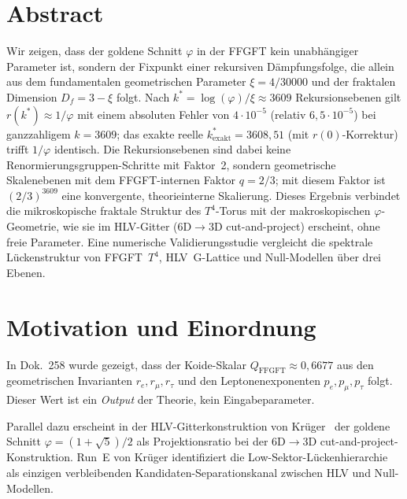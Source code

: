 
\section*{Abstract}
Wir zeigen, dass der goldene Schnitt $\varphi$ in der FFGFT kein unabhängiger
Parameter ist, sondern der Fixpunkt einer rekursiven Dämpfungsfolge, die allein
aus dem fundamentalen geometrischen Parameter $\xi = 4/30000$ und der fraktalen
Dimension $D_f = 3-\xi$ folgt. Nach
$k^* = \log(\varphi)/\xi \approx 3609$ Rekursionsebenen gilt
$r(k^*) \approx 1/\varphi$ mit einem absoluten Fehler von $4{\cdot}10^{-5}$ (relativ $6{,}5{\cdot}10^{-5}$) bei ganzzahligem $k=3609$; das exakte reelle $k^*_\mathrm{exakt}=3608{,}51$ (mit $r(0)$-Korrektur) trifft $1/\varphi$ identisch.
Die Rekursionsebenen sind dabei keine Renormierungsgruppen-Schritte mit Faktor~2,
sondern geometrische Skalenebenen mit dem FFGFT-internen Faktor $q = 2/3$;
mit diesem Faktor ist $(2/3)^{3609}$ eine konvergente, theorieinterne
Skalierung. Dieses Ergebnis verbindet die mikroskopische fraktale Struktur des
$T^4$-Torus mit der makroskopischen $\varphi$-Geometrie, wie sie im HLV-Gitter
(6D$\to$3D cut-and-project) erscheint, ohne freie Parameter.
Eine numerische Validierungsstudie vergleicht die spektrale Lückenstruktur von
FFGFT~$T^4$, HLV~G-Lattice und Null-Modellen über drei Ebenen.

\section{Motivation und Einordnung}

In Dok.~258 wurde gezeigt, dass der Koide-Skalar
$Q_\mathrm{FFGFT} \approx 0{,}6677$ aus den geometrischen Invarianten
$r_e, r_\mu, r_\tau$ und den Leptonenexponenten $p_e, p_\mu, p_\tau$ folgt.
Dieser Wert ist ein \emph{Output} der Theorie, kein Eingabeparameter.

Parallel dazu erscheint in der HLV-Gitterkonstruktion von
Krüger~\cite{krueger275} der goldene Schnitt $\varphi = (1+\sqrt{5})/2$
als Projektionsratio bei der 6D$\to$3D cut-and-project-Konstruktion.
Run~E von Krüger identifiziert die Low-Sektor-Lücken\-hierarchie als einzigen
verbleibenden Kandidaten-Separationskanal zwischen HLV und Null-Modellen.

